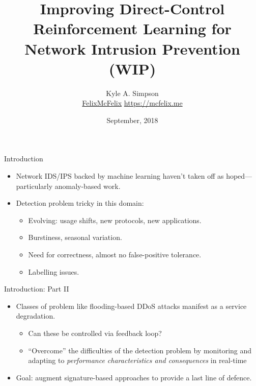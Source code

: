 \documentclass[aspectratio=169,xcolor={dvipsnames}
,hide notes
]{beamer}
\title{Improving Direct-Control Reinforcement Learning for Network Intrusion Prevention (WIP)}
\author{Kyle A. Simpson\\
	\small{\faGithub{} \href{https://github.com/felixmcfelix}{FelixMcFelix} \hspace{0.5em} \faGlobe{} \url{https://mcfelix.me}}}
\institute{University of Glasgow}
\date{\nth{3} September, 2018}
\begin{document}
\maketitle

\begin{frame}{Introduction}
	\begin{itemize}
		\item Network IDS/IPS backed by machine learning haven't taken off as hoped---particularly anomaly-based work.
		\item Detection problem tricky in this domain:
		\begin{itemize}
			\item Evolving: usage shifts, new protocols, new applications.
			\item Burstiness, seasonal variation.
			\item Need for correctness, almost no false-positive tolerance.
			\item Labelling issues.
		\end{itemize}
	\end{itemize}
\end{frame}

\begin{frame}{Introduction: Part II}
\begin{itemize}
	\item Classes of problem like flooding-based DDoS attacks manifest as a service degradation.
	\begin{itemize}
		\item Can these be controlled via feedback loop?
		\item \alert{``Overcome'' the difficulties of the detection problem} by monitoring and adapting to \emph{performance characteristics and consequences} in real-time
	\end{itemize}
	\item Goal: augment signature-based approaches to provide a last line of defence.
\end{itemize}
\end{frame}

\end{document}
